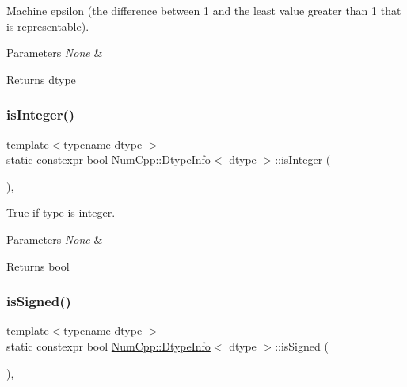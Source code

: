 Machine epsilon (the difference between 1 and the least value greater than 1 that is representable).


\begin{DoxyParams}{Parameters}
{\em None} & \\
\hline
\end{DoxyParams}
\begin{DoxyReturn}{Returns}
dtype 
\end{DoxyReturn}
\mbox{\label{class_num_cpp_1_1_dtype_info_a32d737185a788bba65eba2d26fbc5bd8}} 
\subsubsection{\texorpdfstring{is\+Integer()}{isInteger()}}
{\footnotesize\ttfamily template$<$typename dtype $>$ \\
static constexpr bool \mbox{\hyperlink{class_num_cpp_1_1_dtype_info}{Num\+Cpp\+::\+Dtype\+Info}}$<$ dtype $>$\+::is\+Integer (\begin{DoxyParamCaption}{ }\end{DoxyParamCaption})\hspace{0.3cm}{\ttfamily [inline]}, {\ttfamily [static]}}

True if type is integer.


\begin{DoxyParams}{Parameters}
{\em None} & \\
\hline
\end{DoxyParams}
\begin{DoxyReturn}{Returns}
bool 
\end{DoxyReturn}
\mbox{\label{class_num_cpp_1_1_dtype_info_ac21f1389476091ea0b8d966e657fe647}} 
\subsubsection{\texorpdfstring{is\+Signed()}{isSigned()}}
{\footnotesize\ttfamily template$<$typename dtype $>$ \\
static constexpr bool \mbox{\hyperlink{class_num_cpp_1_1_dtype_info}{Num\+Cpp\+::\+Dtype\+Info}}$<$ dtype $>$\+::is\+Signed (\begin{DoxyParamCaption}{ }\end{DoxyParamCaption})\hspace{0.3cm}{\ttfamily [inline]}, {\ttfamily [static]}}

